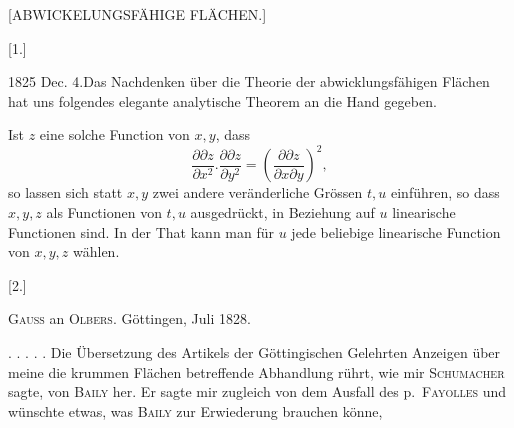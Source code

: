 \clearpage
{}
\begin{center}\large [ABWICKELUNGSFÄHIGE FLÄCHEN.]\end{center}
\begin{center}[1.]\end{center}
\noindent\hspace*{1.2em}1825 Dec. 4.\quad Das Nachdenken über die Theorie der abwicklungsfähigen Flächen hat uns folgendes elegante analytische Theorem an die Hand gegeben.

Ist $z$ eine solche Function von $x,y$, dass
\[
\frac{\partial\partial z}{\partial x^2}.\frac{\partial\partial z}{\partial y^2}
=\left(\frac{\partial\partial z}{\partial x\partial y}\right)^2,
\]
\noindent so lassen sich statt $x,y$ zwei andere veränderliche Grössen $t,u$ einführen, so dass $x,y,z$ als Functionen von $t,u$ ausgedrückt, in Beziehung auf $u$ linearische Functionen sind. In der That kann man für $u$ jede beliebige linearische Function von $x,y,z$ wählen.

\begin{center}[2.]\end{center}
\begin{center}\textsc{Gauss} an \textsc{Olbers}. Göttingen, Juli 1828.\end{center}
\noindent\hspace*{1.2em}. . . . . Die Übersetzung des Artikels der Göttingischen Gelehrten Anzeigen über meine die krummen Flächen betreffende Abhandlung rührt, wie mir \textsc{Schumacher} sagte, von \textsc{Baily} her. Er sagte mir zugleich von dem Ausfall des p.\ \textsc{Fayolles} und wünschte etwas, was \textsc{Baily} zur Erwiederung brauchen könne,

